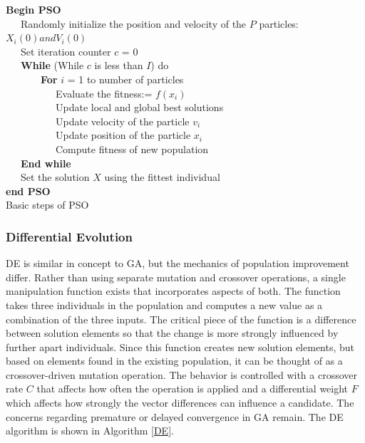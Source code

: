 \documentclass{tamuccthesis}
\begin{document}
\begin{algorithm}%
\textbf{Begin PSO}\\
~~~Randomly initialize the position and velocity of the $P$ particles: $X_i(0) and V_i(0)$\\
~~~Set iteration counter $c$ = 0 \\
~~~\textbf{While} (While $c$ is less than $I$) do\\
~~~~~~~\textbf{For} $i$ = 1 to number of particles \\
 ~~~~~~~~~~Evaluate the fitness:= $ f(x_i)$\\
 ~~~~~~~~~~Update local and global best solutions \\ 
 ~~~~~~~~~~Update velocity of the particle $v_i$\\
 ~~~~~~~~~~Update position of the particle $x_i$\\
 ~~~~~~~~~~Compute fitness of new population\\
~~~\textbf{End while} \\
~~~Set the solution $X$ using the fittest individual \\
\textbf{end PSO}\\
\caption{Basic steps of PSO} 
\label{PSO}
\end{algorithm}

\subsubsection{Differential Evolution }

DE is similar in concept to GA, but the mechanics of population improvement differ. Rather than using separate mutation and crossover operations, a single manipulation function exists that incorporates aspects of both. The function takes three individuals in the population and computes a new value as a combination of the three inputs. The critical piece of the function is a difference between solution elements so that the change is more strongly influenced by further apart individuals. Since this function creates new solution elements, but based on elements found in the existing population, it can be thought of as a crossover-driven mutation operation. The behavior is controlled with a crossover rate $C$ that affects how often the operation is applied and a differential weight $F$ which affects how strongly the vector differences can influence a candidate. The concerns regarding premature or delayed convergence in GA remain. The DE algorithm is shown in Algorithm \ref{DE}.
\end{document}
